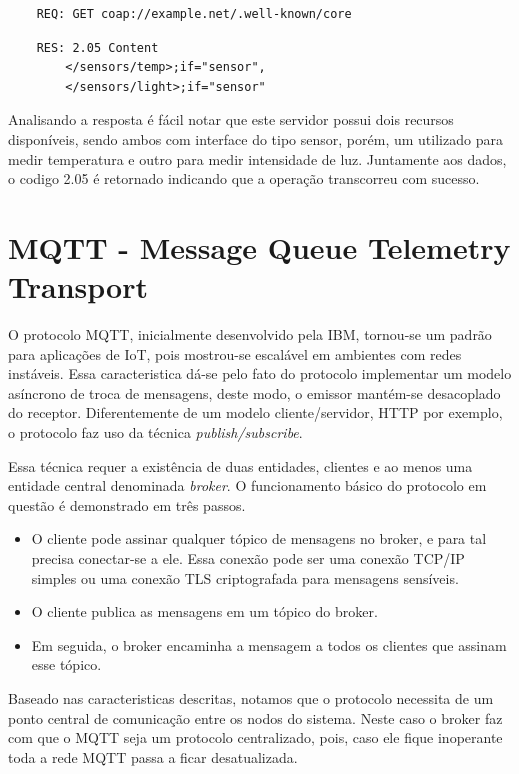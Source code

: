 \begin{verbatim}
    REQ: GET coap://example.net/.well-known/core
\end{verbatim}

\begin{verbatim}
    RES: 2.05 Content
        </sensors/temp>;if="sensor",
        </sensors/light>;if="sensor"
\end{verbatim}


Analisando a resposta é fácil notar que este servidor possui dois recursos disponíveis,
sendo ambos com interface do tipo sensor, porém, um utilizado para medir temperatura e outro para medir intensidade de luz.
Juntamente aos dados, o codigo 2.05 é retornado indicando que a operação transcorreu com sucesso.

\section{MQTT - Message Queue Telemetry Transport}

O protocolo MQTT, inicialmente desenvolvido pela IBM, tornou-se um padrão para aplicações de IoT, pois mostrou-se escalável em ambientes com redes instáveis.
Essa caracteristica dá-se pelo fato do protocolo implementar um modelo asíncrono de troca de mensagens, deste modo, o emissor mantém-se desacoplado do receptor.
Diferentemente de um modelo cliente/servidor, HTTP por exemplo, o protocolo faz uso da técnica \textit{publish/subscribe}.


Essa técnica requer a existência de duas entidades, clientes e ao menos uma entidade central denominada \textit{broker}.
O funcionamento básico do protocolo em questão é demonstrado em três passos.

\begin{itemize}
    \item O cliente pode assinar qualquer tópico de mensagens no broker, e para tal precisa conectar-se a ele. Essa conexão pode ser uma conexão TCP/IP simples ou uma conexão TLS criptografada para mensagens sensíveis.
    \item O cliente publica as mensagens em um tópico do broker.
    \item Em seguida, o broker encaminha a mensagem a todos os clientes que assinam esse tópico.
\end{itemize}

Baseado nas caracteristicas descritas, notamos que o protocolo necessita de um ponto central de comunicação entre os nodos do sistema.
Neste caso o broker faz com que o MQTT seja um protocolo centralizado, pois, caso ele fique inoperante toda a rede MQTT passa a ficar desatualizada.

